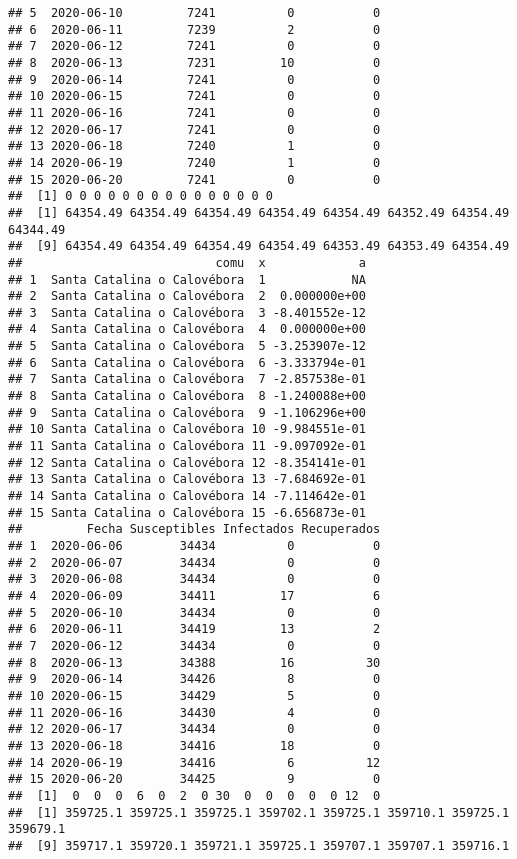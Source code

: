 \documentclass[
]{article}
\begin{document}
\begin{verbatim}
## 5  2020-06-10         7241          0           0
## 6  2020-06-11         7239          2           0
## 7  2020-06-12         7241          0           0
## 8  2020-06-13         7231         10           0
## 9  2020-06-14         7241          0           0
## 10 2020-06-15         7241          0           0
## 11 2020-06-16         7241          0           0
## 12 2020-06-17         7241          0           0
## 13 2020-06-18         7240          1           0
## 14 2020-06-19         7240          1           0
## 15 2020-06-20         7241          0           0
##  [1] 0 0 0 0 0 0 0 0 0 0 0 0 0 0 0
##  [1] 64354.49 64354.49 64354.49 64354.49 64354.49 64352.49 64354.49 64344.49
##  [9] 64354.49 64354.49 64354.49 64354.49 64353.49 64353.49 64354.49
##                           comu  x             a
## 1  Santa Catalina o Calovébora  1            NA
## 2  Santa Catalina o Calovébora  2  0.000000e+00
## 3  Santa Catalina o Calovébora  3 -8.401552e-12
## 4  Santa Catalina o Calovébora  4  0.000000e+00
## 5  Santa Catalina o Calovébora  5 -3.253907e-12
## 6  Santa Catalina o Calovébora  6 -3.333794e-01
## 7  Santa Catalina o Calovébora  7 -2.857538e-01
## 8  Santa Catalina o Calovébora  8 -1.240088e+00
## 9  Santa Catalina o Calovébora  9 -1.106296e+00
## 10 Santa Catalina o Calovébora 10 -9.984551e-01
## 11 Santa Catalina o Calovébora 11 -9.097092e-01
## 12 Santa Catalina o Calovébora 12 -8.354141e-01
## 13 Santa Catalina o Calovébora 13 -7.684692e-01
## 14 Santa Catalina o Calovébora 14 -7.114642e-01
## 15 Santa Catalina o Calovébora 15 -6.656873e-01
##         Fecha Susceptibles Infectados Recuperados
## 1  2020-06-06        34434          0           0
## 2  2020-06-07        34434          0           0
## 3  2020-06-08        34434          0           0
## 4  2020-06-09        34411         17           6
## 5  2020-06-10        34434          0           0
## 6  2020-06-11        34419         13           2
## 7  2020-06-12        34434          0           0
## 8  2020-06-13        34388         16          30
## 9  2020-06-14        34426          8           0
## 10 2020-06-15        34429          5           0
## 11 2020-06-16        34430          4           0
## 12 2020-06-17        34434          0           0
## 13 2020-06-18        34416         18           0
## 14 2020-06-19        34416          6          12
## 15 2020-06-20        34425          9           0
##  [1]  0  0  0  6  0  2  0 30  0  0  0  0  0 12  0
##  [1] 359725.1 359725.1 359725.1 359702.1 359725.1 359710.1 359725.1 359679.1
##  [9] 359717.1 359720.1 359721.1 359725.1 359707.1 359707.1 359716.1

\end{verbatim}
\end{document}
